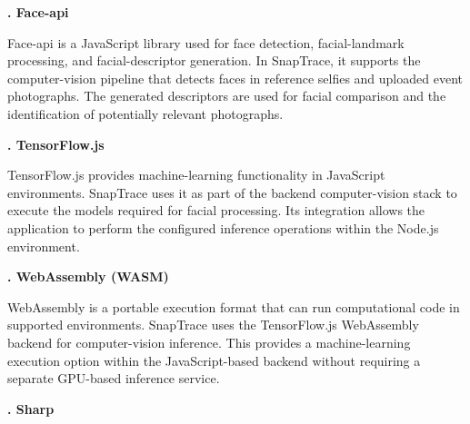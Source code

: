 \vspace{0.4cm}
{ \noindent \bfseries \fontsize{14pt}{15pt}. Face-api
    \par}

\vspace{0.2cm}
\par \noindent Face-api is a JavaScript library used for face detection, facial-landmark processing, and facial-descriptor generation. In SnapTrace, it supports the computer-vision pipeline that detects faces in reference selfies and uploaded event photographs. The generated descriptors are used for facial comparison and the identification of potentially relevant photographs.

\vspace{0.4cm}
{ \noindent \bfseries \fontsize{14pt}{15pt}. TensorFlow.js
    \par}

\vspace{0.2cm}
\par \noindent TensorFlow.js provides machine-learning functionality in JavaScript environments. SnapTrace uses it as part of the backend computer-vision stack to execute the models required for facial processing. Its integration allows the application to perform the configured inference operations within the Node.js environment.

\vspace{0.4cm}
{ \noindent \bfseries \fontsize{14pt}{15pt}. WebAssembly (WASM)
    \par}

\vspace{0.2cm}
\par \noindent WebAssembly is a portable execution format that can run computational code in supported environments. SnapTrace uses the TensorFlow.js WebAssembly backend for computer-vision inference. This provides a machine-learning execution option within the JavaScript-based backend without requiring a separate GPU-based inference service.

\vspace{0.4cm}
{ \noindent \bfseries \fontsize{14pt}{15pt}. Sharp
    \par}

